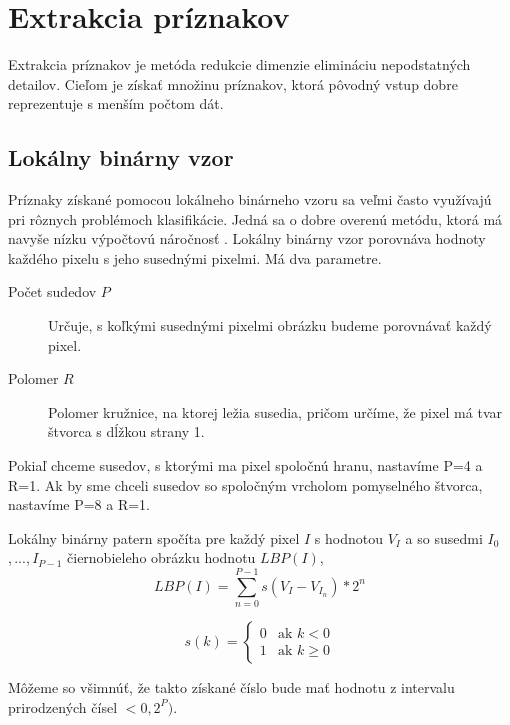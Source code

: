 \def\lc{\left\lfloor}
\def\rc{\right\rfloor}

\section{Extrakcia príznakov}
Extrakcia príznakov je metóda redukcie dimenzie elimináciu nepodstatných detailov.
Cieľom je získať množinu príznakov, ktorá pôvodný vstup dobre reprezentuje s menším počtom dát.

\subsection{Lokálny binárny vzor}
Príznaky získané pomocou lokálneho binárneho vzoru sa veľmi často využívajú pri rôznych problémoch klasifikácie.
Jedná sa o dobre overenú metódu, ktorá má navyše nízku výpočtovú náročnosť \cite{lbp}.
Lokálny binárny vzor porovnáva hodnoty každého pixelu s jeho susednými pixelmi.
Má dva parametre.
\begin{description}
\item[Počet sudedov $P$] Určuje, s koľkými susednými pixelmi obrázku budeme porovnávať každý pixel.
\item[Polomer $R$] Polomer kružnice, na ktorej ležia susedia, pričom určíme, že pixel má tvar štvorca s dĺžkou strany 1.
\end{description}
Pokiaľ chceme susedov, s ktorými ma pixel spoločnú hranu, nastavíme P=4 a R=1.
Ak by sme chceli susedov so spoločným vrcholom pomyselného štvorca, nastavíme P=8 a R=1.

Lokálny binárny patern spočíta pre každý pixel $I$ s hodnotou $V_I$ a so susedmi $I_0$,\,...,\,$I_{P-1}$ čiernobieleho obrázku hodnotu $LBP(I)$,
$$LBP(I) = \sum_{n=0}^{P-1} s(V_I - V_{I_n})*2^n $$


\[
  s(k) =
  \begin{cases}
    0 & \text{ak $k < 0$} \\
    1 & \text{ak $k \geq 0$}
  \end{cases}
\]

Môžeme so všimnúť, že takto získané číslo bude mať hodnotu z intervalu prirodzených čísel $<0, 2^P)$.

  
